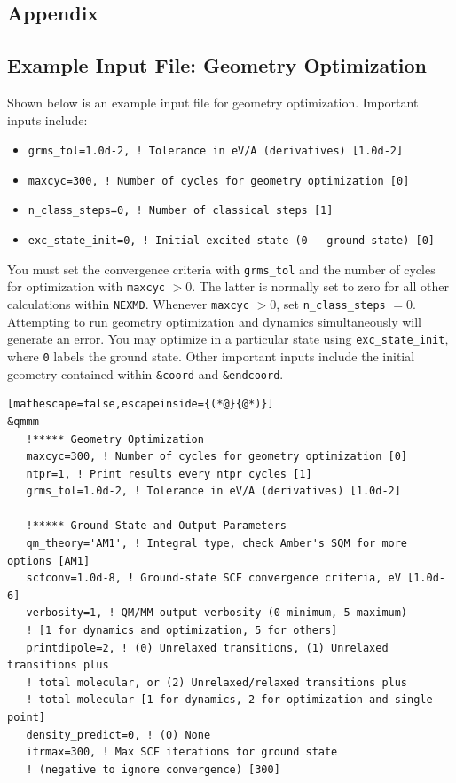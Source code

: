 \documentclass[letterpaper,12pt,titlepage]{article}
\begin{document}
\newpage



\newpage
\begin{appendix}
\section{Appendix}
\subsection{Example Input File: Geometry Optimization}
\label{input_geopt}
Shown below is an example input file for geometry optimization.  Important inputs include:
\begin{itemize}
\item \verb+grms_tol=1.0d-2, ! Tolerance in eV/A (derivatives) [1.0d-2]+
\item \verb+maxcyc=300, ! Number of cycles for geometry optimization [0]+
\item \verb+n_class_steps=0, ! Number of classical steps [1]+
\item \verb+exc_state_init=0, ! Initial excited state (0 - ground state) [0]+
\end{itemize}
You must set the convergence criteria with \verb+grms_tol+ and the number of cycles for optimization with \verb+maxcyc+ $> 0$.  The latter is normally set to zero for all other calculations within \verb+NEXMD+.  Whenever \verb+maxcyc+ $>0$, set \verb+n_class_steps+ $= 0$.  Attempting to run geometry optimization and dynamics simultaneously will generate an error.  You may optimize in a particular state using \verb+exc_state_init+, where \verb+0+ labels the ground state.  Other important inputs include the initial geometry contained within \verb+&coord+ and \verb+&endcoord+.
\begin{lstlisting}[mathescape=false,escapeinside={(*@}{@*)}]
&qmmm
   !***** Geometry Optimization
   maxcyc=300, ! Number of cycles for geometry optimization [0]
   ntpr=1, ! Print results every ntpr cycles [1]
   grms_tol=1.0d-2, ! Tolerance in eV/A (derivatives) [1.0d-2]

   !***** Ground-State and Output Parameters
   qm_theory='AM1', ! Integral type, check Amber's SQM for more options [AM1]
   scfconv=1.0d-8, ! Ground-state SCF convergence criteria, eV [1.0d-6]
   verbosity=1, ! QM/MM output verbosity (0-minimum, 5-maximum)
   ! [1 for dynamics and optimization, 5 for others]
   printdipole=2, ! (0) Unrelaxed transitions, (1) Unrelaxed transitions plus 
   ! total molecular, or (2) Unrelaxed/relaxed transitions plus 
   ! total molecular [1 for dynamics, 2 for optimization and single-point]
   density_predict=0, ! (0) None
   itrmax=300, ! Max SCF iterations for ground state 
   ! (negative to ignore convergence) [300]


\end{lstlisting}
\end{appendix}
\end{document}
